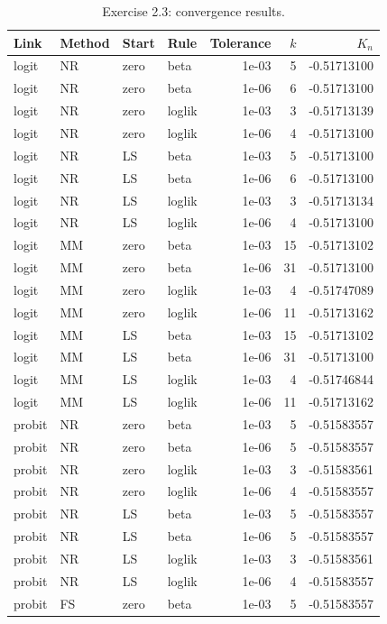 \begin{table}[htbp]
\centering
\small
\caption{Exercise 2.3: convergence results.}
\begin{tabular}{llllrrr}
\toprule
Link & Method & Start & Rule & Tolerance & $k$ & $K_n$ \\
\midrule
logit & NR & zero & beta & 1e-03 &  5 & -0.51713100 \\
logit & NR & zero & beta & 1e-06 &  6 & -0.51713100 \\
logit & NR & zero & loglik & 1e-03 &  3 & -0.51713139 \\
logit & NR & zero & loglik & 1e-06 &  4 & -0.51713100 \\
logit & NR & LS & beta & 1e-03 &  5 & -0.51713100 \\
logit & NR & LS & beta & 1e-06 &  6 & -0.51713100 \\
logit & NR & LS & loglik & 1e-03 &  3 & -0.51713134 \\
logit & NR & LS & loglik & 1e-06 &  4 & -0.51713100 \\
logit & MM & zero & beta & 1e-03 & 15 & -0.51713102 \\
logit & MM & zero & beta & 1e-06 & 31 & -0.51713100 \\
logit & MM & zero & loglik & 1e-03 &  4 & -0.51747089 \\
logit & MM & zero & loglik & 1e-06 & 11 & -0.51713162 \\
logit & MM & LS & beta & 1e-03 & 15 & -0.51713102 \\
logit & MM & LS & beta & 1e-06 & 31 & -0.51713100 \\
logit & MM & LS & loglik & 1e-03 &  4 & -0.51746844 \\
logit & MM & LS & loglik & 1e-06 & 11 & -0.51713162 \\
probit & NR & zero & beta & 1e-03 &  5 & -0.51583557 \\
probit & NR & zero & beta & 1e-06 &  5 & -0.51583557 \\
probit & NR & zero & loglik & 1e-03 &  3 & -0.51583561 \\
probit & NR & zero & loglik & 1e-06 &  4 & -0.51583557 \\
probit & NR & LS & beta & 1e-03 &  5 & -0.51583557 \\
probit & NR & LS & beta & 1e-06 &  5 & -0.51583557 \\
probit & NR & LS & loglik & 1e-03 &  3 & -0.51583561 \\
probit & NR & LS & loglik & 1e-06 &  4 & -0.51583557 \\
probit & FS & zero & beta & 1e-03 &  5 & -0.51583557 \\

\end{tabular}
\end{table}
